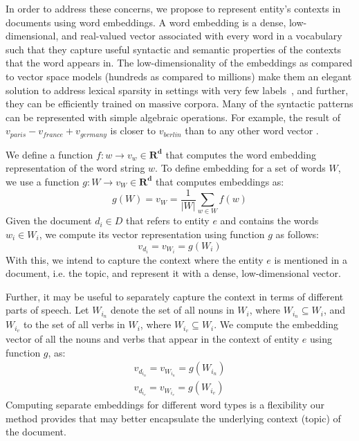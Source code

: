 \documentclass{article}
\begin{document}
In order to address these concerns, we propose to represent entity's contexts in documents using word embeddings.
A word embedding is a dense, low-dimensional, and real-valued vector associated with every word in a vocabulary such that they capture useful syntactic and semantic properties of the contexts that the word appears in.
The low-dimensionality of the embeddings as compared to vector space models (hundreds as compared to millions) make them an elegant solution to address lexical sparsity in settings with very few labels~\cite{Turian10wordrepresentations}, and further, they can be efficiently trained on massive corpora.
Many of the syntactic patterns can be represented with simple algebraic operations. For example, the result of $v_{paris} - v_{france} + v_{germany}$ is closer to $v_{berlin}$ than to any other word vector \cite{mikolovChen,mikolovYih}.


We define a function $f : w \rightarrow v_w \in \mathbf{R^d}$ that computes the word embedding representation of the word string $w$. 
To define embedding for a set of words $W$, we use a function $g : W \rightarrow v_W \in \mathbf{R^d}$ that computes embeddings as: %
\begin{equation}
\label{wordembedding}
g(W) = v_W = \frac{1}{|W|} \sum_{w \in W}{f(w)}
\end{equation}
Given the document $d_i \in D$ that refers to entity $e$ and contains the words $w_i \in W_i$, we compute its vector representation using function $g$ as follows:
\begin{equation}
\label{wordembedding1}
v_{d_i} = v_{W_i} = g(W_i)
\end{equation}
With this, we intend to capture the context where the entity $e$ is mentioned in a document, i.e. the topic, and represent it with a dense, low-dimensional vector.

Further, it may be useful to separately capture the context in terms of different parts of speech.
Let $W_{i_n}$ denote the set of all nouns in $W_i$, where $W_{i_n} \subseteq W_i$, and $W_{i_v}$ to the set of all verbs in $W_i$, where $W_{i_v} \subseteq W_i$. We compute the embedding vector of all the nouns and verbs that appear in the context of entity $e$ using function $g$, as: %
\begin{eqnarray}
v_{d_{i_n}} = v_{W_{i_n}} = g(W_{i_n})\label{nouns}
\\
v_{d_{i_v}} = v_{W_{i_v}} = g(W_{i_v})\label{verbs}
\end{eqnarray}
Computing separate embeddings for different word types is a flexibility our method provides that may better encapsulate the underlying context (topic) of the document.
\end{document}
